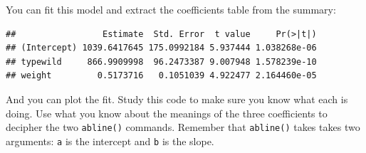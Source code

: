 \documentclass[]{book}
\newenvironment{Shaded}{\begin{snugshade}}{\end{snugshade}}
\newcommand{\KeywordTok}[1]{\textcolor[rgb]{0.13,0.29,0.53}{\textbf{#1}}}
\newcommand{\DataTypeTok}[1]{\textcolor[rgb]{0.13,0.29,0.53}{#1}}
\newcommand{\DecValTok}[1]{\textcolor[rgb]{0.00,0.00,0.81}{#1}}
\newcommand{\FloatTok}[1]{\textcolor[rgb]{0.00,0.00,0.81}{#1}}
\newcommand{\StringTok}[1]{\textcolor[rgb]{0.31,0.60,0.02}{#1}}
\newcommand{\OperatorTok}[1]{\textcolor[rgb]{0.81,0.36,0.00}{\textbf{#1}}}
\newcommand{\NormalTok}[1]{#1}
\theoremstyle{definition}
\theoremstyle{definition}
\theoremstyle{definition}
\theoremstyle{remark}
\begin{document}
You can fit this model and extract the coefficients table from the
summary:

\begin{Shaded}
\end{Shaded}

\begin{verbatim}
##                 Estimate  Std. Error  t value     Pr(>|t|)
## (Intercept) 1039.6417645 175.0992184 5.937444 1.038268e-06
## typewild     866.9909998  96.2473387 9.007948 1.578239e-10
## weight         0.5173716   0.1051039 4.922477 2.164460e-05
\end{verbatim}

And you can plot the fit. Study this code to make sure you know what
each is doing. Use what you know about the meanings of the three
coefficients to decipher the two \texttt{abline()} commands. Remember
that \texttt{abline()} takes takes two arguments: \texttt{a} is the
intercept and \texttt{b} is the slope.

\begin{Shaded}
\end{Shaded}
\end{document}
